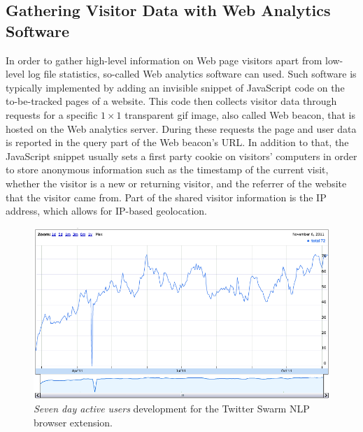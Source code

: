 \documentclass{iosart2c}
\begin{document}
\subsection{Gathering Visitor Data with Web Analytics Software}
In order to gather high-level information on Web page visitors apart from low-level log file statistics, so-called Web analytics software can used.
Such software is typically implemented by adding an invisible snippet of JavaScript code on the to-be-tracked pages of a website.
This code then collects visitor data through requests for a specific $\mathit{1} \times \mathit{1}$ transparent gif image, also called Web beacon, that is hosted on the Web analytics server.
During these requests the page and user data is reported in the query part of the Web beacon's URL.
In addition to that, the JavaScript snippet usually sets a first party cookie on visitors' computers in order to store anonymous information such as the timestamp of the current visit, whether the visitor is a new or returning visitor, and the referrer of the website that the visitor came from.
Part of the shared visitor information is the IP address, which allows for IP-based geolocation.

\begin{figure}
\centering
\includegraphics[width=1.0\linewidth]{./resources/twitterswarmnlpstats.png}
\caption{\textit{Seven day active users} development for the Twitter Swarm NLP browser extension.}
\label{fig:twitterswarmnlpstats}
\end{figure}
\end{document}
